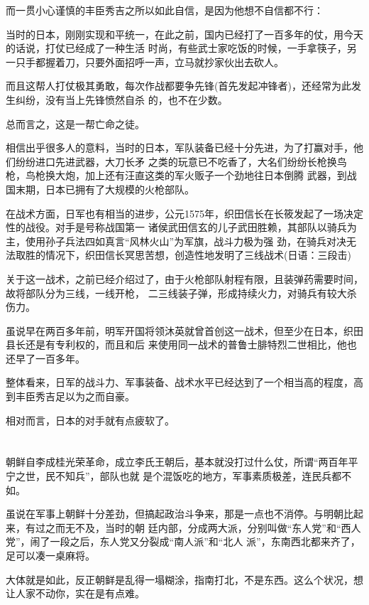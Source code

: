 \documentclass[11pt,a4paper,onecolumn]{article}
\begin{document}
而一贯小心谨慎的丰臣秀吉之所以如此自信，是因为他想不自信都不行：

当时的日本，刚刚实现和平统一，在此之前，国内已经打了一百多年的仗，用今天的话说，打仗已经成了一种生活
时尚，有些武士家吃饭的时候，一手拿筷子，另一只手都握着刀，只要外面招呼一声，立马就抄家伙出去砍人。

而且这帮人打仗极其勇敢，每次作战都要争先锋(首先发起冲锋者)，还经常为此发生纠纷，没有当上先锋愤然自杀
的，也不在少数。

总而言之，这是一帮亡命之徒。

相信出乎很多人的意料，当时的日本，军队装备已经十分先进，为了打赢对手，他们纷纷进口先进武器，大刀长矛
之类的玩意已不吃香了，大名们纷纷长枪换鸟枪，鸟枪换大炮，加上还有汪直这类的军火贩子一个劲地往日本倒腾
武器，到战国末期，日本已拥有了大规模的火枪部队。

在战术方面，日军也有相当的进步，公元1575年，织田信长在长筱发起了一场决定性的战役。对手是号称战国第一
诸侯武田信玄的儿子武田胜赖，其部队以骑兵为主，使用孙子兵法四如真言``风林火山''为军旗，战斗力极为强
劲，在骑兵对决无法取胜的情况下，织田信长冥思苦想，创造性地发明了三线战术(日语：三段击)

关于这一战术，之前已经介绍过了，由于火枪部队射程有限，且装弹药需要时间，故将部队分为三线，一线开枪，
二三线装子弹，形成持续火力，对骑兵有较大杀伤力。

虽说早在两百多年前，明军开国将领沐英就曾首创这一战术，但至少在日本，织田县长还是有专利权的，而且和后
来使用同一战术的普鲁士腓特烈二世相比，他也还早了一百多年。

整体看来，日军的战斗力、军事装备、战术水平已经达到了一个相当高的程度，高到丰臣秀吉足以为之而自豪。

相对而言，日本的对手就有点疲软了。

\section[\thesection]{}

朝鲜自李成桂光荣革命，成立李氏王朝后，基本就没打过什么仗，所谓``两百年平宁之世，民不知兵''，部队也就
是个混饭吃的地方，军事素质极差，连民兵都不如。

虽说在军事上朝鲜十分差劲，但搞起政治斗争来，那是一点也不消停。与明朝比起来，有过之而无不及，当时的朝
廷内部，分成两大派，分别叫做``东人党''和``西人党''，闹了一段之后，东人党又分裂成``南人派''和``北人
派''，东南西北都来齐了，足可以凑一桌麻将。

大体就是如此，反正朝鲜是乱得一塌糊涂，指南打北，不是东西。这么个状况，想让人家不动你，实在是有点难。
\end{document}
